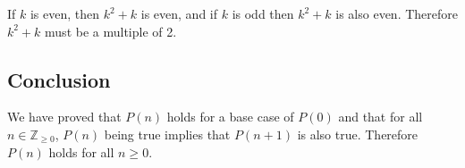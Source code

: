 \documentclass{article}
\begin{document}
If $k$ is even, then $k^2 + k$ is even, and if $k$ is odd then $k^2 + k$ is also even. Therefore $k^2 + k$ must be a multiple of 2.

\subsection{Conclusion}
We have proved that $P(n)$ holds for a base case of $P(0)$ and that for all $n \in \mathbb Z_{\ge 0}$, $P(n)$ being true implies that $P(n + 1)$ is also true. Therefore $P(n)$ holds for all $n \ge 0$.
\end{document}
